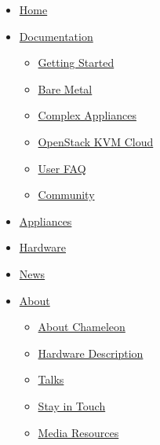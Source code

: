 \FILENAME

\begin{itemize}
\item
  \href{https://www.chameleoncloud.org/}{Home}
\item
  \href{openstack-kvm-user-guide.html\#}{Documentation }

  \begin{itemize}
    \item
    \href{https://www.chameleoncloud.org/docs/getting-started/}{Getting
    Started}
  \item
    \href{https://www.chameleoncloud.org/docs/bare-metal-user-guide/}{Bare
    Metal}
  \item
    \href{https://www.chameleoncloud.org/docs/complex-appliances/}{Complex
    Appliances}
  \item
    \href{https://www.chameleoncloud.org/docs/openstack-kvm-cloud/}{OpenStack
    KVM Cloud}
  \item
    \href{https://www.chameleoncloud.org/docs/user-faq/}{User FAQ}
  \item
    \href{https://www.chameleoncloud.org/docs/community/}{Community}
  \end{itemize}
\item
  \href{https://www.chameleoncloud.org/appliances/}{Appliances}
\item
  \href{https://www.chameleoncloud.org/hardware/}{Hardware}
\item
  \href{https://www.chameleoncloud.org/news/}{News}
\item
  \href{openstack-kvm-user-guide.html\#}{About }

  \begin{itemize}
    \item
    \href{https://www.chameleoncloud.org/about/chameleon/}{About
    Chameleon}
  \item
    \href{https://www.chameleoncloud.org/about/hardware-description/}{Hardware
    Description}
  \item
    \href{https://www.chameleoncloud.org/talks/}{Talks}
  \item
    \href{https://www.chameleoncloud.org/about/newsletter/}{Stay in
    Touch}
  \item
    \href{https://www.chameleoncloud.org/about/media-resources/}{Media
    Resources}
  \end{itemize}
\end{itemize}

